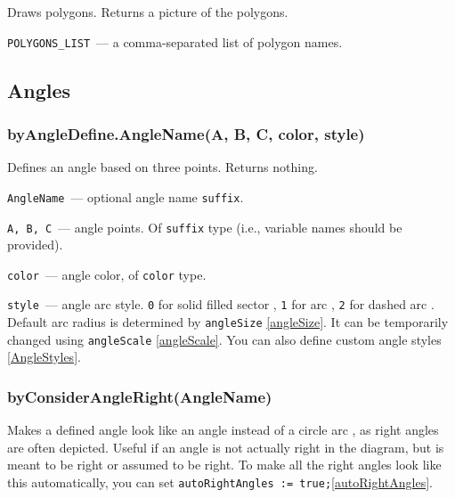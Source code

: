 	Draws polygons. Returns a picture of the polygons.
	
	\texttt{POLYGONS\_LIST}~— a comma-separated list of polygon names.


\subsection{Angles}

\subsubsection{byAngleDefine.AngleName(A, B, C, color, style)}\label{byAngleDefine}
	
	
	Defines an angle based on three points. Returns nothing.

	\texttt{AngleName}~— optional angle name \texttt{suffix}.
		
	\texttt{A, B, C}~— angle points. Of \texttt{suffix} type (i.e., variable names should be provided).
	
	\texttt{color}~— angle color, of \texttt{color} type.
	
	\texttt{style}~— angle arc style. \texttt{0} for solid filled sector , \texttt{1} for arc , \texttt{2} for dashed arc . Default arc radius is determined by \texttt{angleSize} \ref{angleSize}. It can be temporarily changed using \texttt{angleScale} \ref{angleScale}. You can also define custom angle styles \ref{AngleStyles}. 
	
\subsubsection{byConsiderAngleRight(AngleName)}\label{byConsiderAngleRight}

	Makes a defined angle look like an angle  instead of a circle arc , as right angles are often depicted. Useful if an angle is not actually right in the diagram, but is meant to be right or assumed to be right. To make all the right angles look like this automatically, you can set \texttt{autoRightAngles := true;}\ref{autoRightAngles}.
	
